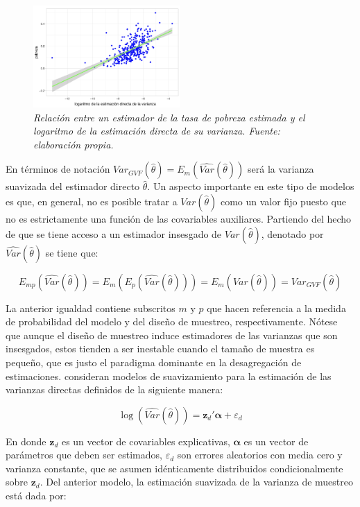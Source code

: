 \documentclass[
  12pt,
]{book}
\begin{document}
\begin{figure}
\centering
\includegraphics[width=0.5\textwidth,height=\textheight]{Pics/GVFmds.png}
\caption{\emph{Relación entre un estimador de la tasa de pobreza estimada y el logaritmo de la estimación directa de su varianza. Fuente: elaboración propia.}}
\end{figure}

En términos de notación \(Var_{GVF}(\hat{\theta}) = E_m(\widehat{Var}(\hat{\theta}))\) será la varianza suavizada del estimador directo \(\hat{\theta}\). Un aspecto importante en este tipo de modelos es que, en general, no es posible tratar a \(Var(\hat{\theta})\) como un valor fijo puesto que no es estrictamente una función de las covariables auxiliares. Partiendo del hecho de que se tiene acceso a un estimador insesgado de \({Var}(\hat{\theta})\), denotado por \(\widehat{Var}(\hat{\theta})\) se tiene que:

\[
E_{mp}\left(\widehat{Var}(\hat{\theta})\right) =
E_m\left(E_p\left(\widehat{Var}(\hat{\theta})\right)\right) =
E_m({Var}(\hat{\theta})) =
Var_{GVF}(\hat{\theta}) 
\]

La anterior igualdad contiene subscritos \(m\) y \(p\) que hacen referencia a la medida de probabilidad del modelo y del diseño de muestreo, respectivamente. Nótese que aunque el diseño de muestreo induce estimadores de las varianzas que son insesgados, estos tienden a ser inestable cuando el tamaño de muestra es pequeño, que es justo el paradigma dominante en la desagregación de estimaciones. \citet{Rivest_Belmonte_2000} consideran modelos de suavizamiento para la estimación de las varianzas directas definidos de la siguiente manera:

\[
\log(\widehat{Var}(\hat{\theta})) = \mathbf z_d' \boldsymbol \alpha + \varepsilon_d
\]

En donde \(\mathbf z_d\) es un vector de covariables explicativas, \(\boldsymbol \alpha\) es un vector de parámetros que deben ser estimados, \(\varepsilon_d\) son errores aleatorios con media cero y varianza constante, que se asumen idénticamente distribuidos condicionalmente sobre \(\mathbf z_d\). Del anterior modelo, la estimación suavizada de la varianza de muestreo está dada por:
\end{document}
